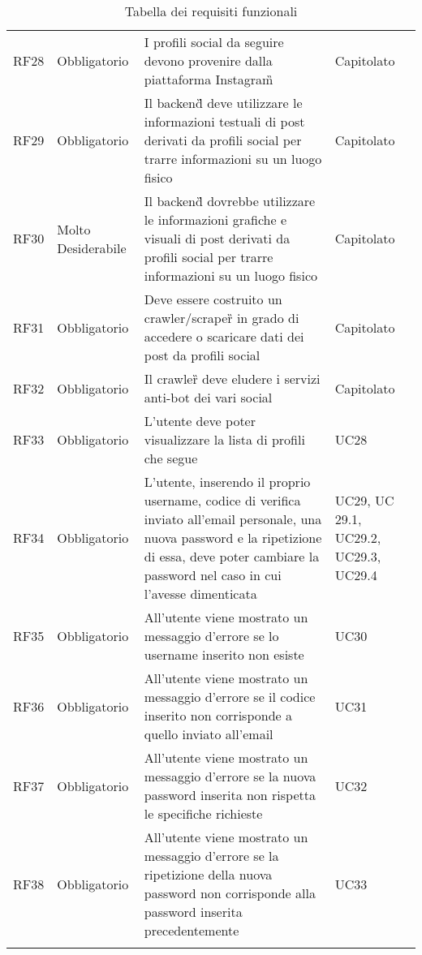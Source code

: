 {\begin{longtable}{C{.15\freewidth} C{.2\freewidth} C{.528\freewidth} C{.15\freewidth}}
      RF28 & Obbligatorio & I profili social da seguire devono provenire dalla piattaforma Instagram\G{} & Capitolato \\   
      RF29 & Obbligatorio & Il backend\G{} deve utilizzare le informazioni testuali di post derivati da profili social per trarre informazioni su un luogo fisico & Capitolato \\
      RF30 & Molto Desiderabile & Il backend\G{} dovrebbe utilizzare le informazioni grafiche e visuali di post derivati da profili social per trarre informazioni su un luogo fisico & Capitolato \\
      RF31 & Obbligatorio & Deve essere costruito un crawler/scraper\G{} in grado di accedere o scaricare dati dei post da profili social & Capitolato \\
      RF32 & Obbligatorio & Il crawler\G{} deve eludere i servizi anti-bot dei vari social & Capitolato \\
      RF33 & Obbligatorio & L'utente deve poter visualizzare la lista di profili che segue & UC28 \\
      RF34 & Obbligatorio & L'utente, inserendo il proprio username, codice di verifica inviato all'email personale, una nuova password e la ripetizione di essa, deve poter cambiare la password nel caso in cui l'avesse dimenticata & UC29, UC 29.1, UC29.2, UC29.3, UC29.4 \\
      RF35 & Obbligatorio & All'utente viene mostrato un messaggio d'errore se lo username inserito non esiste & UC30 \\
      RF36 & Obbligatorio & All'utente viene mostrato un messaggio d'errore se il codice inserito non corrisponde a quello inviato all'email & UC31 \\
      RF37 & Obbligatorio & All'utente viene mostrato un messaggio d'errore se la nuova password inserita non rispetta le specifiche richieste & UC32 \\
      RF38 & Obbligatorio & All'utente viene mostrato un messaggio d'errore se la ripetizione della nuova password non corrisponde alla password inserita precedentemente & UC33 \\
      \bottomrule
      \caption{Tabella dei requisiti funzionali}
      \end{longtable}
}
